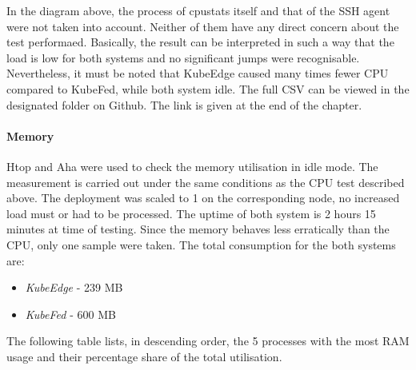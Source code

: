 \documentclass[MIC,Master,english]{twbook}%
\begin{document}
In the diagram above, the process of cpustats itself and that of the SSH agent were not taken into account. Neither of them have any direct concern about the test performaed. Basically, the result can be interpreted in such a way that the load is low for both systems and no significant jumps were recognisable. Nevertheless, it must be noted that KubeEdge caused many times fewer CPU compared to KubeFed, while both system idle. The full CSV can be viewed in the designated folder on Github. The link is given at the end of the chapter.

\paragraph{Memory} Htop\cite{htop} and \ac{Aha}\cite{aha} were used to check the memory utilisation in idle mode. The measurement is carried out under the same conditions as the CPU test described above. The deployment was scaled to 1 on the corresponding node, no increased load must or had to be processed. The uptime of both system is 2 hours 15 minutes at time of testing. Since the memory behaves less erratically than the CPU, only one sample were taken. The total consumption for the both systems are:

\begin{itemize}
    \itemsep0em 
    \item \textit{KubeEdge} - 239 MB
    \item \textit{KubeFed} - 600 MB
\end{itemize}

The following table lists, in descending order, the 5 processes with the most RAM usage and their percentage share of the total utilisation.
\end{document}
